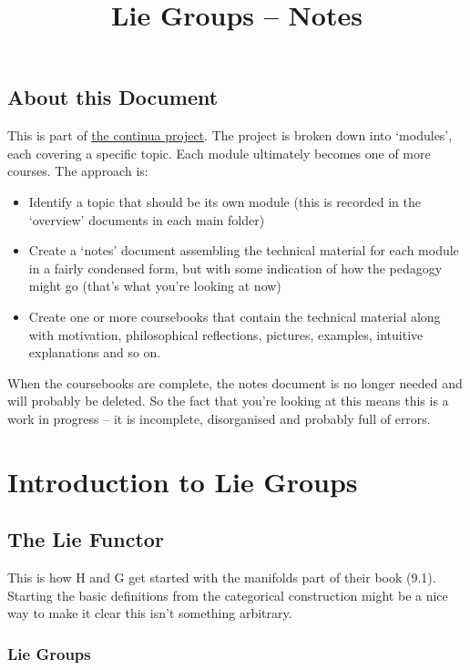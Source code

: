 \documentclass[oneside,english]{amsbook}
\numberwithin{section}{chapter}
\theoremstyle{plain}
\theoremstyle{definition}
\begin{document}
	
	\title{Lie Groups -- Notes}
	
	\maketitle
	
	\tableofcontents
	
	\chapter*{About this Document}
	
	This is part of \href{https://github.com/FineArtMaths/continua}{the continua project}. The project is broken down into `modules', each covering a specific topic. Each module ultimately becomes one of more courses. The approach is:
	
	\begin{itemize}
		\item{Identify a topic that should be its own module (this is recorded in the `overview' documents in each main folder)}
		\item{Create a `notes' document assembling the technical material for each module in a fairly condensed form, but with some indication of how the pedagogy might go (that's what you're looking at now)}
		\item{Create one or more coursebooks that contain the technical material along with motivation, philosophical reflections, pictures, examples, intuitive explanations and so on.}
	\end{itemize}
	
	When the coursebooks are complete, the notes document is no longer needed and will probably be deleted. So the fact that you're looking at this means this is a work in progress -- it is incomplete, disorganised and probably full of errors.
	
	\part{Introduction to Lie Groups}
	
	\chapter{The Lie Functor}
	
	This is how H and G get started with the manifolds part of their book (9.1). Starting the basic definitions from the categorical construction might be a nice way to make it clear this isn't something arbitrary.
		\section{Lie Groups}
\end{document}
